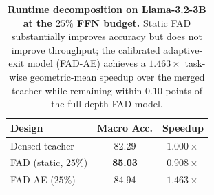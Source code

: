 \documentclass[letterpaper]{article} %
\theoremstyle{plain}
\theoremstyle{definition}
\begin{document}
\begin{table}[t]
\centering\small
\setlength{\tabcolsep}{7pt}\renewcommand{\arraystretch}{1.05}
\begin{tabular}{@{}lcc@{}}
\toprule
\textbf{Design} & \textbf{Macro Acc.} & \textbf{Speedup}\\
\midrule
Densed teacher          & 82.29 & $1.000\times$\\
FAD (static, $25\%$)    & \textbf{85.03} & $0.908\times$\\
FAD-AE ($25\%$)         & 84.94 & \textbf{$1.463\times$}\\
\bottomrule
\end{tabular}
\caption{\textbf{Runtime decomposition on Llama-3.2-3B at the $25\%$ FFN
budget.} {Static FAD substantially improves accuracy but does not improve
throughput; the calibrated adaptive-exit model (FAD-AE) achieves a
$1.463\times$ task-wise geometric-mean speedup over the merged teacher while
remaining within $0.10$ points of the full-depth FAD model.}}
\label{tab:runtime-decomp}
\end{table}
\end{document}
